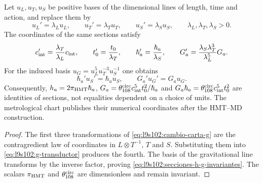 \begin{theorem}
\label{thm:l9s102:covariancia-unidades-g}
Let \(u_L,u_T,u_S\) be positive bases of the dimensional lines of
length, time and action, and replace them by
\[
 u_L'=\lambda_Lu_L,\qquad
 u_T'=\lambda_Tu_T,\qquad
 u_S'=\lambda_Su_S,
 \qquad \lambda_L,\lambda_T,\lambda_S>0.
\]
The coordinates of the same sections satisfy
\begin{equation}
 c_{\rm int}'=\frac{\lambda_T}{\lambda_L}c_{\rm int},\qquad
 t_0'=\frac{t_0}{\lambda_T},\qquad
 \hbar_a'=\frac{\hbar_a}{\lambda_S},\qquad
 G_a'=\frac{\lambda_S\lambda_T^3}{\lambda_L^5}G_a.
 \label{eq:l9s102:cambio-carta-g}
\end{equation}
For the induced basis
\(u_G=u_L^5u_T^{-3}u_S^{-1}\) one obtains
\begin{equation}
 \hbar_a'u_S'=\hbar_au_S,
 \qquad G_a'u_G'=G_au_G.
 \label{eq:l9s102:secciones-h-g-invariantes}
\end{equation}
Consequently,
\(h_a=2\pi_{\rm HMT}\hbar_a\),
\(G_a=\theta_{108}^{\rm circ}c_{\rm int}^5t_0^2/\hbar_a\) and
\(G_a\hbar_a=\theta_{108}^{\rm circ}c_{\rm int}^5t_0^2\)
are identities of sections, not equalities dependent on a choice of
units. The metrological chart publishes their numerical coordinates after
the HMT--MD construction.
\end{theorem}

\begin{proof}
The first three transformations of
\eqref{eq:l9s102:cambio-carta-g} are the contragredient law of coordinates
in \(L\otimes T^{-1}\), \(T\) and \(S\). Substituting them into
\eqref{eq:l9s102:g-transductor} produces the fourth. The basis of the gravitational
line transforms by the inverse factor, proving
\eqref{eq:l9s102:secciones-h-g-invariantes}. The scalars
\(\pi_{\rm HMT}\) and \(\theta_{108}^{\rm circ}\) are dimensionless and
remain invariant.
\end{proof}
